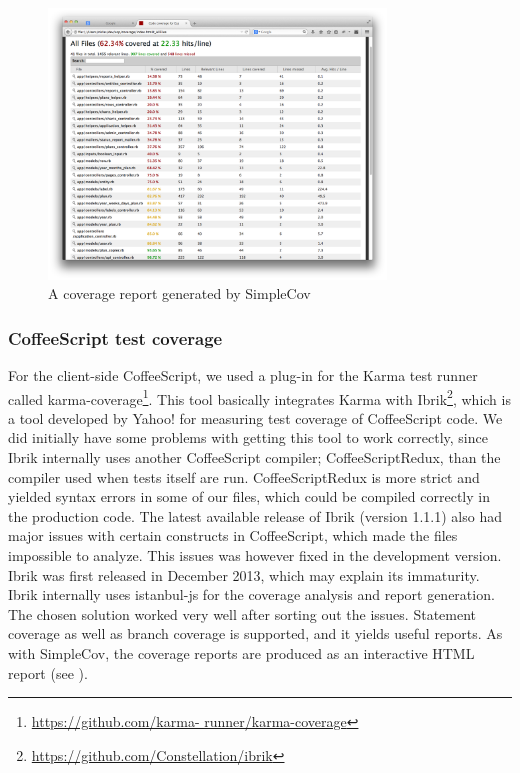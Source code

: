 \begin{figure}
\centering
\includegraphics[width=0.8\textwidth]{results/simplecov}
\caption{A coverage report generated by SimpleCov}
\label{fig:simplecov_report}
\end{figure}

\subsubsection{CoffeeScript test coverage}
For the client-side CoffeeScript, we used a plug-in for the Karma test
runner called karma-coverage\footnote{\url{https://github.com/karma-
runner/karma-coverage}}. This tool basically integrates Karma with
Ibrik\footnote{\url{https://github.com/Constellation/ibrik}}, which is a
tool developed by Yahoo! for measuring test coverage of CoffeeScript
code. We did initially have some problems with getting this tool to work
correctly, since Ibrik internally uses another CoffeeScript compiler;
CoffeeScriptRedux, than the compiler used when tests itself are run.
CoffeeScriptRedux is more strict and yielded syntax errors in some of
our files, which could be compiled correctly in the production code. The
latest available release of Ibrik (version 1.1.1) also had major issues
with certain constructs in CoffeeScript, which made the files impossible
to analyze. This issues was however fixed in the development version.
Ibrik was first released in December 2013, which may explain its
immaturity. Ibrik internally uses istanbul-js for the coverage
analysis and report generation.\\

The chosen solution worked very well after sorting out the issues.
Statement coverage as well as branch coverage is supported, and it
yields useful reports. As with SimpleCov, the coverage reports are
produced as an interactive HTML report (see ).\\

